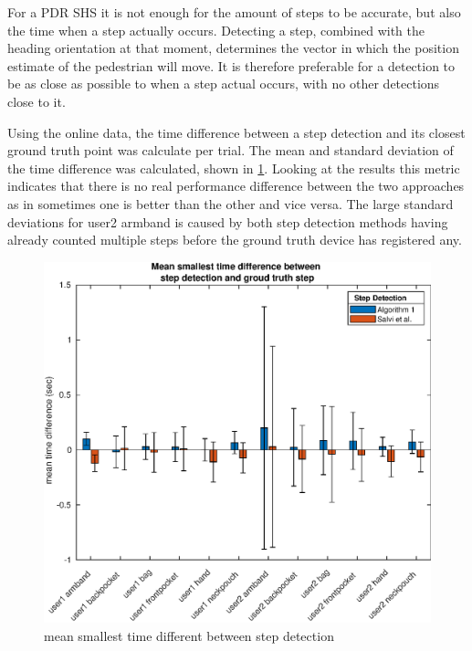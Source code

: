 For a PDR SHS it is not enough for the amount of steps to be accurate, but also the time when a step actually occurs. Detecting a step, combined with the heading orientation at that moment, determines the vector in which the position estimate of the pedestrian will move. It is therefore preferable for a detection to be as close as possible to when a step actual occurs, with no other detections close to it. \par
Using the online data, the time difference between a step detection and its closest ground truth point was calculate per trial. The mean and standard deviation of the time difference was calculated, shown in \cref{fig:202011130914smallest_diff_to_gt_1}. Looking at the results this metric indicates that there is no real performance difference between the two approaches as in sometimes one is better than the other and vice versa. The large standard deviations for user2 armband is caused by both step detection methods having already counted multiple steps before the ground truth device has registered any.

\begin{figure}[H]
	\centering
	\includegraphics[width=0.7\linewidth]{images/20201113_0914_smallest_diff_to_gt_1}
	\caption{mean smallest time different between step detection}
	\label{fig:202011130914smallest_diff_to_gt_1}
\end{figure}

